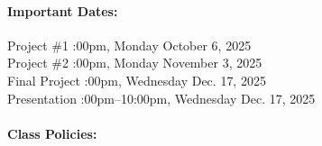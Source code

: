 \documentclass[11pt, a4paper]{article}
\begin{document}
\paragraph{Important Dates:}
\begin{center} \begin{minipage}{3.8in}
\begin{flushleft}
Project \#1      :00pm, Monday October 6, 2025 \\
Project \#2      :00pm, Monday November 3, 2025\\
Final Project    :00pm, Wednesday Dec. 17, 2025\\
Presentation :00pm--10:00pm, Wednesday Dec. 17, 2025\\
\end{flushleft}
\end{minipage}
\end{center}

\paragraph{Class Policies:}
\end{document}
